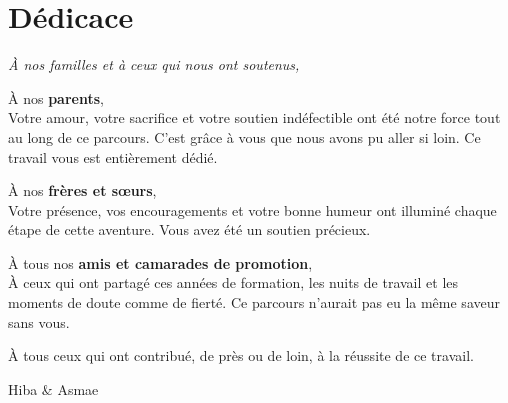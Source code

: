 \chapter*{Dédicace}
\thispagestyle{plain}

\vspace*{2cm}

\begin{center}
    \textit{\large À nos familles et à ceux qui nous ont soutenus,}
\end{center}

\vspace{1cm}

\noindent À nos \textbf{parents},\\[0.4cm]
Votre amour, votre sacrifice et votre soutien indéfectible ont été notre force tout au long de ce parcours. C'est grâce à vous que nous avons pu aller si loin. Ce travail vous est entièrement dédié.

\vspace{0.8cm}

\noindent À nos \textbf{frères et sœurs},\\[0.4cm]
Votre présence, vos encouragements et votre bonne humeur ont illuminé chaque étape de cette aventure. Vous avez été un soutien précieux.

\vspace{0.8cm}

\noindent À tous nos \textbf{amis et camarades de promotion},\\[0.4cm]
À ceux qui ont partagé ces années de formation, les nuits de travail et les moments de doute comme de fierté. Ce parcours n'aurait pas eu la même saveur sans vous.

\vspace{0.8cm}

\noindent À tous ceux qui ont contribué, de près ou de loin, à la réussite de ce travail.

\vspace{1.5cm}

\begin{flushright}
    {\large Hiba \& Asmae}
\end{flushright}

\newpage
